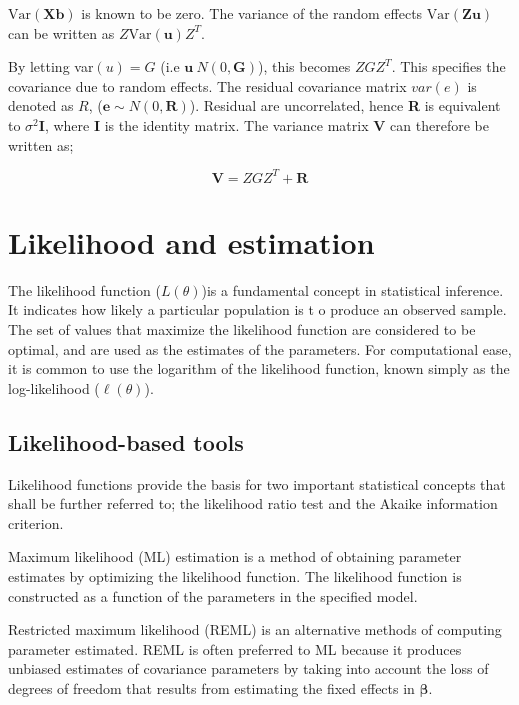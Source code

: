 \documentclass[12pt, a4paper]{report}
\theoremstyle{plain}
\theoremstyle{definition}
\theoremstyle{remark}
\begin{document}
$\mbox{Var}(\textbf{Xb})$ is known to be zero. The variance of the
random effects $\mbox{Var}(\textbf{Zu})$ can be written as
$Z\mbox{Var}(\textbf{u})Z^{T}$.

By letting var$(u) = G$ (i.e $\textbf{u} ~ N(0,\textbf{G})$), this
becomes $ZGZ^{T}$. This specifies the covariance due to random
effects. The residual covariance matrix $var(e)$ is denoted as
$R$, ($\textbf{e} \sim N(0,\textbf{R})$). Residual are uncorrelated,
hence \textbf{R} is equivalent to $\sigma^{2}$\textbf{I}, where
\textbf{I} is the identity matrix. The variance matrix \textbf{V}
can therefore be written as;

\begin{equation}
\textbf{V}  = ZGZ^{T} + \textbf{R}
\end{equation}




\section{Likelihood and estimation}
The likelihood function ($L(\theta)$)is a fundamental concept in statistical
inference. It indicates how likely a particular population is t o
produce an observed sample. The set of values that maximize the
likelihood function are considered to be optimal, and are used as
the estimates of the parameters. For computational ease, it is common to use the logarithm of the likelihood function, known simply as the log-likelihood ($\ell(\theta)$).

\subsection{Likelihood-based tools}
Likelihood functions provide the basis for two important statistical concepts that shall be further referred to; the likelihood ratio test and the Akaike information criterion.

Maximum likelihood (ML) estimation is a method of obtaining
parameter estimates by optimizing the likelihood function. The
likelihood function is constructed as a function of the parameters
in the specified model.

Restricted maximum likelihood (REML) is an alternative methods of
computing parameter estimated. REML is often preferred to ML
because it produces unbiased estimates of covariance parameters by
taking into account the loss of degrees of freedom that results
from estimating the fixed effects in $\boldsymbol{\beta}$.
\end{document}
